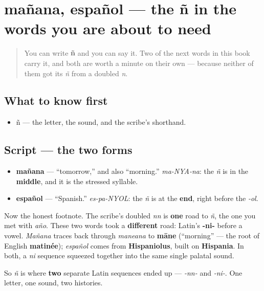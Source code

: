 \section[mañana, español]{mañana, español — the ñ in the words you are about to need}

\label{lesson:ES-W02-enye-formas}



\begin{quote}
You can write \textbf{ñ} and you can say it. Two of the next words in this book carry it, and both are worth a minute on their own — because neither of them got its \emph{ñ} from a doubled \emph{n}.
\end{quote}

\subsection*{What to know first}
\begin{itemize}
\raggedright
  \item ñ — the letter, the sound, and the scribe's shorthand.
\end{itemize}

\subsection*{Script — the two forms}
\begin{itemize}
\raggedright
  \item \textbf{mañana} — \textquotedblleft{}tomorrow,\textquotedblright{} and also \textquotedblleft{}morning.\textquotedblright{} \emph{ma-NYA-na}: the \emph{ñ} is in the \textbf{middle}, and it is the stressed syllable.
  \item \textbf{español} — \textquotedblleft{}Spanish.\textquotedblright{} \emph{es-pa-NYOL}: the \emph{ñ} is at the \textbf{end}, right before the \emph{-ol}.
\end{itemize}

Now the honest footnote. The scribe's doubled \emph{nn} is \textbf{one} road to \emph{ñ}, the one you met with \emph{año}. These two words took a \textbf{different} road: Latin's \textbf{-ni-} before a vowel. \emph{Mañana} traces back through \emph{maneana} to \textbf{māne} (\textquotedblleft{}morning\textquotedblright{} — the root of English \textbf{matinée}); \emph{español} comes from \textbf{Hispaniolus}, built on \textbf{Hispania}. In both, a \emph{ni} sequence squeezed together into the same single palatal sound.

So \emph{ñ} is where \textbf{two} separate Latin sequences ended up — \emph{-nn-} and \emph{-ni-}. One letter, one sound, two histories.

